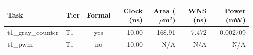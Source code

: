\begin{tabular}{llcrrrr}
\toprule
Task & Tier & Formal & Clock (ns) & Area ($\mu$m$^2$) & WNS (ns) & Power (mW) \\
\midrule
t1\_gray\_counter & T1 & yes & 10.00 & 168.91 & 7.472 & 0.002709 \\
t1\_pwm & T1 & no & 10.00 & N/A & N/A & N/A \\
\bottomrule
\end{tabular}
